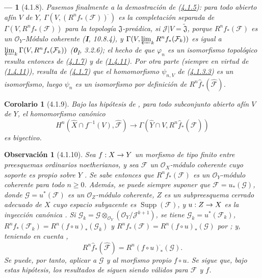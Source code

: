 \documentclass[10pt,oneside,openany]{book}
\theoremstyle{egaenv}\newtheorem*{env}{---}
\theoremstyle{egastatement}
\newtheorem*{corollary}{Corolario}
\theoremstyle{egadescription}
\newtheorem*{remark}{Observación}
\renewcommand{\geq}{\geqslant}
\renewcommand{\to}{\mathchoice{\longrightarrow}{\rightarrow}{\rightarrow}{\rightarrow}}
\begin{document}
\begin{env}[4.1.8]
\label{III.4.1.8-fr}
Pasemos finalmente a la demostración de (\hyperref[III.4.1.5-fr]{4.1.5}): para todo abierto afín $V$ de $Y$,
$\Gamma(V,(R^nf_*(\mathcal F))^{\widehat{\,}})$
es la completación separada de
$\Gamma(V,R^nf_*(\mathcal F))$ para la topología
$\mathfrak J$-preádica, si
$\mathcal J|V=\widetilde{\mathfrak J}$, porque
$R^nf_*(\mathcal F)$ es un $\mathcal O_Y$-Módulo coherente (\textbf{I}, 10.8.4),
y $\Gamma(V,\varprojlim_kR^nf_*(\mathcal F_k))$ es igual a
$\varprojlim_k\Gamma(V,R^nf_*(\mathcal F_k))$
(\textbf{0}\textsubscript{I}, 3.2.6); el hecho de que $\varphi_n$ es un isomorfismo topológico resulta entonces de (\hyperref[III.4.1.7-fr]{4.1.7}) y de (\hyperref[III.1.4.11-fr]{1.4.11}). Por otra parte (siempre en virtud de (\hyperref[III.1.4.11-fr]{1.4.11})), resulta de (\hyperref[III.4.1.7-fr]{4.1.7}) que el homomorfismo $\psi_{n,V}$ de
(\hyperref[III.4.1.3.3-fr]{4.1.3.3}) es un \emph{isomorfismo}, luego $\psi_n$
es un isomorfismo por definición de
$R^n\widehat f_*(\widehat{\mathcal F})$.
\end{env}

\begin{corollary}[4.1.9]
\label{III.4.1.9}
\label{III.4.1.9-fr}
Bajo las hipótesis de , para todo subconjunto abierto
afín $V$ de $Y$, el homomorfismo canónico
\[
H^n(\widehat X\cap f^{-1}(V),\widehat{\mathcal F})
\longrightarrow\Gamma(\widehat Y\cap V,
R^n\widehat f_*(\widehat{\mathcal F}))
\]
es biyectivo.
\end{corollary}

\begin{remark}[4.1.10]
\label{III.4.1.10}
\label{III.4.1.10-fr}
Sea $f:X\to Y$ un morfismo \emph{de tipo finito} entre preesquemas ordinarios
noetherianos, y sea $\mathcal F$ un $\mathcal O_X$-módulo coherente cuyo
soporte es \emph{propio sobre} $Y$ .
Se sabe entonces  que $R^nf_*(\mathcal F)$ es un
$\mathcal O_Y$-módulo coherente para todo $n\geq0$. Además, se puede
siempre suponer que $\mathcal F=u_*(\mathcal G)$, donde
$\mathcal G=u^*(\mathcal F)$ es un $\mathcal O_Z$-módulo coherente, $Z$ es un
subpreesquema cerrado adecuado de $X$ cuyo espacio subyacente es
$\operatorname{Supp}(\mathcal F)$, y $u:Z\to X$ es la inyección canónica
.
Si
$\mathcal G_k=\mathcal G\otimes_{\mathcal O_Y}
(\mathcal O_Y/\mathcal J^{k+1})$,
se tiene $\mathcal G_k=u^*(\mathcal F_k)$,
$R^nf_*(\mathcal F_k)=R^n(f\circ u)_*(\mathcal G_k)$ y
$R^nf_*(\mathcal F)=R^n(f\circ u)_*(\mathcal G)$
por ; y, teniendo en cuenta ,
\[
R^n\widehat f_*(\widehat{\mathcal F})
=R^n(f\circ u)^{\widehat{\,}}_*(\mathcal G).
\]
Se puede, por tanto, aplicar  a $\mathcal G$ y al morfismo
propio $f\circ u$.
Se sigue que, bajo estas hipótesis, \emph{los resultados de}
 \emph{siguen siendo válidos para} $\mathcal F$ \emph{y} $f$.
\end{remark}
\end{document}
